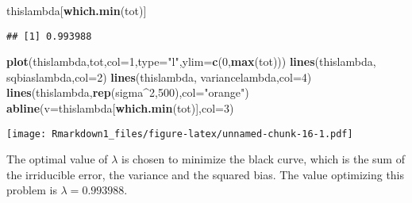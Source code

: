 \documentclass[]{article}
\newenvironment{Shaded}{\begin{snugshade}}{\end{snugshade}}
\newcommand{\KeywordTok}[1]{\textcolor[rgb]{0.13,0.29,0.53}{\textbf{#1}}}
\newcommand{\DataTypeTok}[1]{\textcolor[rgb]{0.13,0.29,0.53}{#1}}
\newcommand{\DecValTok}[1]{\textcolor[rgb]{0.00,0.00,0.81}{#1}}
\newcommand{\StringTok}[1]{\textcolor[rgb]{0.31,0.60,0.02}{#1}}
\newcommand{\OperatorTok}[1]{\textcolor[rgb]{0.81,0.36,0.00}{\textbf{#1}}}
\newcommand{\NormalTok}[1]{#1}
\begin{document}
\begin{Shaded}
\begin{Highlighting}[]
\NormalTok{thislambda[}\KeywordTok{which.min}\NormalTok{(tot)]}
\end{Highlighting}
\end{Shaded}

\begin{verbatim}
## [1] 0.993988
\end{verbatim}

\begin{Shaded}
\begin{Highlighting}[]
\KeywordTok{plot}\NormalTok{(thislambda,tot,}\DataTypeTok{col=}\DecValTok{1}\NormalTok{,}\DataTypeTok{type=}\StringTok{"l"}\NormalTok{,}\DataTypeTok{ylim=}\KeywordTok{c}\NormalTok{(}\DecValTok{0}\NormalTok{,}\KeywordTok{max}\NormalTok{(tot)))}
\KeywordTok{lines}\NormalTok{(thislambda, sqbiaslambda,}\DataTypeTok{col=}\DecValTok{2}\NormalTok{)}
\KeywordTok{lines}\NormalTok{(thislambda, variancelambda,}\DataTypeTok{col=}\DecValTok{4}\NormalTok{)}
\KeywordTok{lines}\NormalTok{(thislambda,}\KeywordTok{rep}\NormalTok{(sigma}\OperatorTok{^}\DecValTok{2}\NormalTok{,}\DecValTok{500}\NormalTok{),}\DataTypeTok{col=}\StringTok{"orange"}\NormalTok{)}
\KeywordTok{abline}\NormalTok{(}\DataTypeTok{v=}\NormalTok{thislambda[}\KeywordTok{which.min}\NormalTok{(tot)],}\DataTypeTok{col=}\DecValTok{3}\NormalTok{)}
\end{Highlighting}
\end{Shaded}

\texttt{[image: Rmarkdown1\_files/figure-latex/unnamed-chunk-16-1.pdf]}

The optimal value of \(\lambda\) is chosen to minimize the black curve,
which is the sum of the irriducible error, the variance and the squared
bias. The value optimizing this problem is \(\lambda = 0.993988\).
\end{document}
